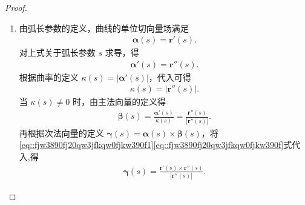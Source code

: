 \documentclass[../../main.tex]{subfiles}%
\begin{document}
\begin{proof}
\begin{enumerate}
\item 由弧长参数的定义，曲线的单位切向量场满足
\begin{align}\label{eq::fjw3890fj20qw3jfkqw0fjkw390f1}
\bm{\alpha}(s) = \bm{r}'(s).
\end{align}
对上式关于弧长参数 $s$ 求导，得
\begin{align*}
\bm{\alpha}'(s) = \bm{r}''(s).
\end{align*}
根据曲率的定义 $\kappa(s) = |\bm{\alpha}'(s)|$，代入可得
\begin{align*}
\kappa(s) = |\bm{r}''(s)|.
\end{align*}
当 $\kappa(s) \neq 0$ 时，由主法向量的定义得
\begin{align}\label{eq::fjw3890fj20qw3jfkqw0fjkw390f}
\bm{\beta}(s) = \frac{\bm{\alpha}'(s)}{\kappa(s)}=\frac{\bm{r}''(s)}{|\bm{r}''(s)|}.
\end{align}
再根据次法向量的定义 $\bm{\gamma}(s) = \bm{\alpha}(s) \times \bm{\beta}(s)$，将\eqref{eq::fjw3890fj20qw3jfkqw0fjkw390f1}\eqref{eq::fjw3890fj20qw3jfkqw0fjkw390f}式代入,得
\begin{align*}
\bm{\gamma}(s) = \frac{\bm{r}'(s) \times \bm{r}''(s)}{|\bm{r}''(s)|}.
\end{align*}


\end{enumerate}
\end{proof}
\end{document}
